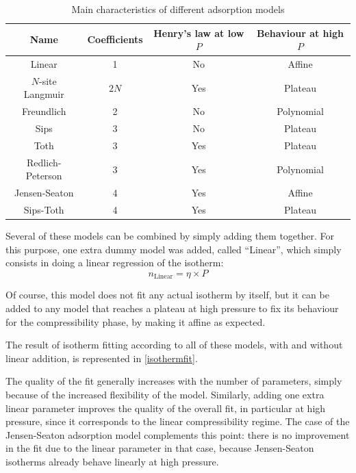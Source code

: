 \documentclass[main.tex]{subfiles}
\begin{document}
\begin{table}[h]
	\centering
	\begin{tabular}{|c|c|c|c|}
		\hline
		\bf Name & \bf Coefficients & \bf Henry's law at low $P$ & \bf Behaviour at high $P$\\\hline
		Linear & 1 & \cellcolor{red!25}No & \cellcolor{green!25}Affine\\\hline
		$N$-site Langmuir & $2N$ & \cellcolor{green!25}Yes & \cellcolor{yellow!25}Plateau \\\hline
		Freundlich & 2 & \cellcolor{red!25} No & \cellcolor{red!25}Polynomial \\\hline
		Sips & 3 & \cellcolor{red!25}No & \cellcolor{yellow!25}Plateau \\\hline
		Toth & 3 & \cellcolor{green!25}Yes & \cellcolor{yellow!25}Plateau \\\hline
		Redlich-Peterson & 3 & \cellcolor{green!25}Yes & \cellcolor{red!25}Polynomial \\\hline
		Jensen-Seaton & 4 & \cellcolor{green!25}Yes & \cellcolor{green!25}Affine \\\hline
		Sips-Toth & 4 & \cellcolor{green!25}Yes & \cellcolor{yellow!25}Plateau \\\hline
	\end{tabular}
	\caption{Main characteristics of different adsorption models}\label{table:adsorptionmodels}
\end{table}

Several of these models can be combined by simply adding them together. For this purpose, one extra dummy model was added, called ``Linear'', which simply consists in doing a linear regression of the isotherm:
\[n_\text{Linear} = \eta\times P\]

Of course, this model does not fit any actual isotherm by itself, but it can be added to any model that reaches a plateau at high pressure to fix its behaviour for the compressibility phase, by making it affine as expected.

The result of isotherm fitting according to all of these models, with and without linear addition, is represented in \cref{isothermfit}.

The quality of the fit generally increases with the number of parameters, simply because of the increased flexibility of the model. Similarly, adding one extra linear parameter improves the quality of the overall fit, in particular at high pressure, since it corresponds to the linear compressibility regime. The case of the Jensen-Seaton adsorption model complements this point: there is no improvement in the fit due to the linear parameter in that case, because Jensen-Seaton isotherms already behave linearly at high pressure.
\end{document}
